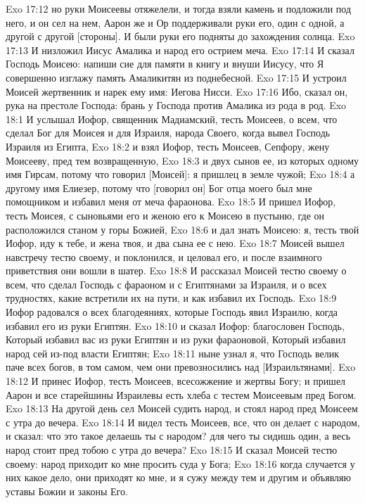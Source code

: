 Exo 17:12  но руки Моисеевы отяжелели, и тогда взяли камень и подложили под него, и он сел на нем, Аарон же и Ор поддерживали руки его, один с одной, а другой с другой [стороны]. И были руки его подняты до захождения солнца.
Exo 17:13  И низложил Иисус Амалика и народ его острием меча.
Exo 17:14  И сказал Господь Моисею: напиши сие для памяти в книгу и внуши Иисусу, что Я совершенно изглажу память Амаликитян из поднебесной.
Exo 17:15  И устроил Моисей жертвенник и нарек ему имя: Иегова Нисси.
Exo 17:16  Ибо, сказал он, рука на престоле Господа: брань у Господа против Амалика из рода в род.
Exo 18:1  И услышал Иофор, священник Мадиамский, тесть Моисеев, о всем, что сделал Бог для Моисея и для Израиля, народа Своего, когда вывел Господь Израиля из Египта,
Exo 18:2  и взял Иофор, тесть Моисеев, Сепфору, жену Моисееву, пред тем возвращенную,
Exo 18:3  и двух сынов ее, из которых одному имя Гирсам, потому что говорил [Моисей]: я пришлец в земле чужой;
Exo 18:4  а другому имя Елиезер, потому что [говорил он] Бог отца моего был мне помощником и избавил меня от меча фараонова.
Exo 18:5  И пришел Иофор, тесть Моисея, с сыновьями его и женою его к Моисею в пустыню, где он расположился станом у горы Божией,
Exo 18:6  и дал знать Моисею: я, тесть твой Иофор, иду к тебе, и жена твоя, и два сына ее с нею.
Exo 18:7  Моисей вышел навстречу тестю своему, и поклонился, и целовал его, и после взаимного приветствия они вошли в шатер.
Exo 18:8  И рассказал Моисей тестю своему о всем, что сделал Господь с фараоном и с Египтянами за Израиля, и о всех трудностях, какие встретили их на пути, и как избавил их Господь.
Exo 18:9  Иофор радовался о всех благодеяниях, которые Господь явил Израилю, когда избавил его из руки Египтян.
Exo 18:10  и сказал Иофор: благословен Господь, Который избавил вас из руки Египтян и из руки фараоновой, Который избавил народ сей из-под власти Египтян;
Exo 18:11  ныне узнал я, что Господь велик паче всех богов, в том самом, чем они превозносились над [Израильтянами].
Exo 18:12  И принес Иофор, тесть Моисеев, всесожжение и жертвы Богу; и пришел Аарон и все старейшины Израилевы есть хлеба с тестем Моисеевым пред Богом.
Exo 18:13  На другой день сел Моисей судить народ, и стоял народ пред Моисеем с утра до вечера.
Exo 18:14  И видел тесть Моисеев, все, что он делает с народом, и сказал: что это такое делаешь ты с народом? для чего ты сидишь один, а весь народ стоит пред тобою с утра до вечера?
Exo 18:15  И сказал Моисей тестю своему: народ приходит ко мне просить суда у Бога;
Exo 18:16  когда случается у них какое дело, они приходят ко мне, и я сужу между тем и другим и объявляю уставы Божии и законы Его.
